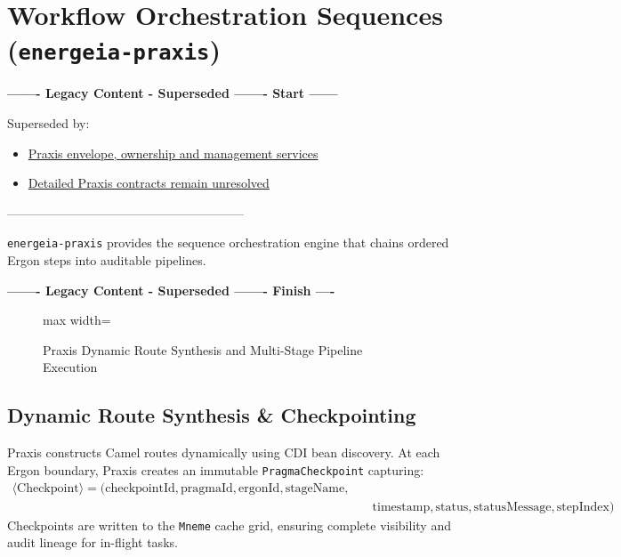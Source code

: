 \section{Workflow Orchestration Sequences (\texttt{energeia-praxis})}

\par\noindent\textbf{------- Legacy Content - Superseded ------- Start ------}
\par\noindent Superseded by:
\begin{itemize}
  \item \href{../../markdown/05-information-systems-architecture/pathways-journeys-and-handoff.md\#praxis-operational-context}{Praxis envelope, ownership and management services}
  \item \href{../../markdown/05-information-systems-architecture/gaps.md}{Detailed Praxis contracts remain unresolved}
\end{itemize}
\noindent ---------------------------------------------------------

\texttt{energeia-praxis} provides the sequence orchestration engine that chains ordered Ergon steps into auditable pipelines.

\par\noindent\textbf{------- Legacy Content - Superseded ------- Finish ----}


\begin{figure}[htbp]
    \centering
    \begin{adjustbox}{max width=\textwidth}
        
    \end{adjustbox}
    \caption{Praxis Dynamic Route Synthesis and Multi-Stage Pipeline Execution}
    \label{fig:energeia_praxis_architecture}
\end{figure}

\subsection{Dynamic Route Synthesis \& Checkpointing}
Praxis constructs Camel routes dynamically using CDI bean discovery. At each Ergon boundary, Praxis creates an immutable \texttt{PragmaCheckpoint} capturing:
\begin{equation}
\begin{aligned}
\langle\text{Checkpoint}\rangle = (\text{checkpointId}, \text{pragmaId}, \text{ergonId}, \text{stageName}, \\
                                  &\quad\text{timestamp}, \text{status}, \text{statusMessage}, \text{stepIndex})
\end{aligned}
\end{equation}
Checkpoints are written to the \texttt{Mneme} cache grid, ensuring complete visibility and audit lineage for in-flight tasks.

\newpage
